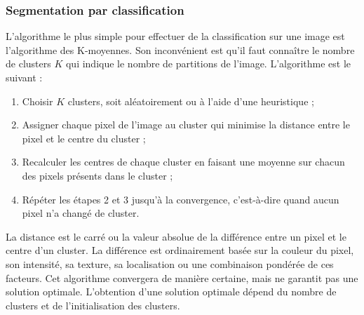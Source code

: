 	\subsubsection{Segmentation par classification}
		L'algorithme le plus simple pour effectuer de la classification sur une image est l'algorithme des K-moyennes. Son inconvénient est qu'il faut connaître le nombre de clusters $K$ qui indique le nombre de partitions de l'image. L'algorithme est le suivant :
		\vspace{10px}
		\begin{enumerate}
			\item Choisir $K$ clusters, soit aléatoirement ou à l'aide d'une heuristique ;
			\item Assigner chaque pixel de l'image au cluster qui minimise la distance entre le pixel et le centre du cluster ;
			\item Recalculer les centres de chaque cluster en faisant une moyenne sur chacun des pixels présents dans le cluster ;
			\item Répéter les étapes 2 et 3 jusqu'à la convergence, c'est-à-dire quand aucun pixel n'a changé de cluster.
		\end{enumerate}
		\vspace{20px}
		La distance est le carré ou la valeur absolue de la différence entre un pixel et le centre d'un cluster. La différence est ordinairement basée sur la couleur du pixel, son intensité, sa texture, sa localisation ou une combinaison pondérée de ces facteurs. Cet algorithme convergera de manière certaine, mais ne garantit pas une solution optimale. L'obtention d'une solution optimale dépend du nombre de clusters et de l'initialisation des clusters.